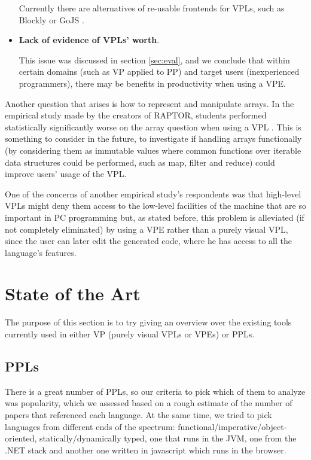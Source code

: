 \begin{itemize}
Currently there are alternatives of re-usable frontends for VPLs,
such as Blockly \cite{blockly} or GoJS \cite{gojs}.
  \item \textbf{Lack of evidence of VPLs' worth}.

This issue was discussed in section
\ref{sec:eval}, and we conclude that within certain domains (such as VP applied
to PP) and target users (inexperienced programmers), there may be benefits in
productivity when using a VPE.
\end{itemize}

Another question that arises is how to represent and manipulate arrays. In the
empirical study made by the creators of RAPTOR, students performed statistically
significantly worse on the array question when using a VPL \cite{Cardellini2002}.
This is something to consider in the future, to investigate if handling arrays
functionally (by considering them as immutable values where common functions over
iterable data structures could be performed, such as map, filter and reduce)
could improve users' usage of the VPL.

One of the concerns of another empirical study's respondents was that high-level VPLs might deny
them access to the low-level facilities of the machine that are so important in PC programming \cite{Whitley1997}
but, as stated before, this problem is alleviated (if not completely eliminated)
by using a VPE rather than a purely visual VPL, since the user can later
edit the generated code, where he has access to all the language's features.

\section{State of the Art}
\label{sec:art}

The purpose of this section is to try giving an overview over the existing tools
currently used in either VP (purely visual VPLs or VPEs) or PPLs.

\subsection{PPLs}
\label{sec:ppls}

There is a great number of PPLs, so our criteria to pick which of them to analyze
was popularity, which we assessed based on a rough estimate of the number of papers
that referenced each language.
At the same time, we tried to pick languages from different
ends of the spectrum: functional/imperative/object-oriented, statically/dynamically
typed, one that runs in the JVM, one from the .NET stack and another one written
in javascript which runs in the browser.

